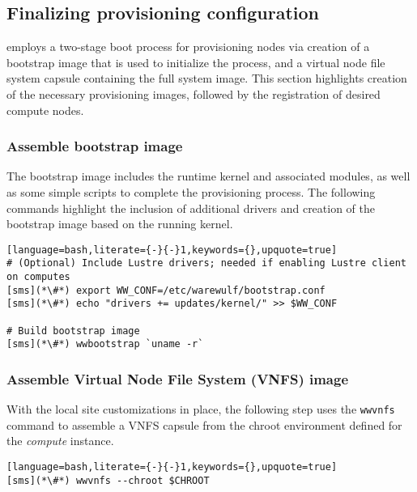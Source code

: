 \subsection{Finalizing provisioning configuration} \label{sec:assemble_bootstrap}

\Warewulf{} employs a two-stage boot process for provisioning nodes via
creation of a bootstrap image that is used to initialize the process, and a virtual node
file system capsule containing the full system image. This section highlights
creation of the necessary provisioning images, followed by the registration of
desired compute nodes.

\subsubsection{Assemble bootstrap image}

The bootstrap image includes the runtime kernel and associated modules, as well
as some simple scripts to complete the provisioning process. The
following commands highlight the inclusion of additional drivers and creation
of the bootstrap image based on the running kernel.

\begin{lstlisting}[language=bash,literate={-}{-}1,keywords={},upquote=true]
# (Optional) Include Lustre drivers; needed if enabling Lustre client on computes
[sms](*\#*) export WW_CONF=/etc/warewulf/bootstrap.conf
[sms](*\#*) echo "drivers += updates/kernel/" >> $WW_CONF

# Build bootstrap image
[sms](*\#*) wwbootstrap `uname -r`
\end{lstlisting}

\subsubsection{Assemble Virtual Node File System (VNFS) image}

With the local site customizations in place, the following step uses the
\texttt{wwvnfs} command to assemble a VNFS capsule from the chroot environment
defined for the {\em compute} instance. 

\begin{lstlisting}[language=bash,literate={-}{-}1,keywords={},upquote=true]
[sms](*\#*) wwvnfs --chroot $CHROOT
\end{lstlisting}

